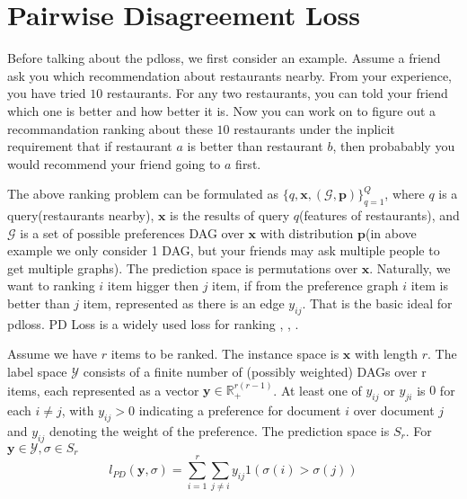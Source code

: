 \section{Pairwise Disagreement Loss}\label{sec:pdloss}



Before talking about the pdloss, we first consider an example. Assume a friend ask you which recommendation about restaurants nearby. From your experience, you have tried $10$ restaurants. For any two restaurants, you can told your friend which one is better and how better it is. Now you can work on to figure out a recommandation ranking about these $10$ restaurants under the inplicit requirement that if restaurant $a$ is better than restaurant $b$, then probabably you would recommend your friend going to $a$ first. 


The above ranking problem can be formulated as $\{q, \mathbf{x}, (\mathcal{G}, \mathbf{p})\}_{q=1}^Q$, where $q$ is a query(restaurants nearby), $\mathbf{x}$ is the results of query $q$(features of restaurants), and $\mathcal{G}$ is a set of possible preferences DAG over $\mathbf{x}$ with distribution $\mathbf{p}$(in above example we only consider 1 DAG, but your friends may ask multiple people to get multiple graphs). The prediction space is permutations over $\mathbf{x}$. Naturally, we want to ranking $i$ item higger then $j$ item, if from the preference graph $i$ item is better than $j$ item, represented as there is an edge $y_{ij}$. That is the basic ideal for pdloss. PD Loss is a widely used loss for ranking \cite{duchi2010ranking}, \cite{lan2012}, \cite{ramaswamy2013convex}. 

Assume we have $r$ items to be ranked. The instance space is $\mathbf{x}$ with length $r$. The label space $\mathcal{Y}$ consists of a finite number of (possibly weighted) DAGs over r items, each represented as a vector $\mathbf{y}\in \mathbb{R}_+^{r(r-1)}$. At least one of $y_{ij}$ or $y_{ji}$ is $0$ for each $i\not=j$, with $y_{ij}>0$ indicating a preference for document $i$ over document $j$ and $y_{ij}$ denoting the weight of the preference. The prediction space is $S_r$. For $\mathbf{y}\in \mathcal{Y}, \sigma\in S_r$
$$l_{PD}(\mathbf{y}, \sigma)=\sum\limits_{i=1}^r\sum\limits_{j\not=i}y_{ij}1(\sigma(i)>\sigma(j))$$

